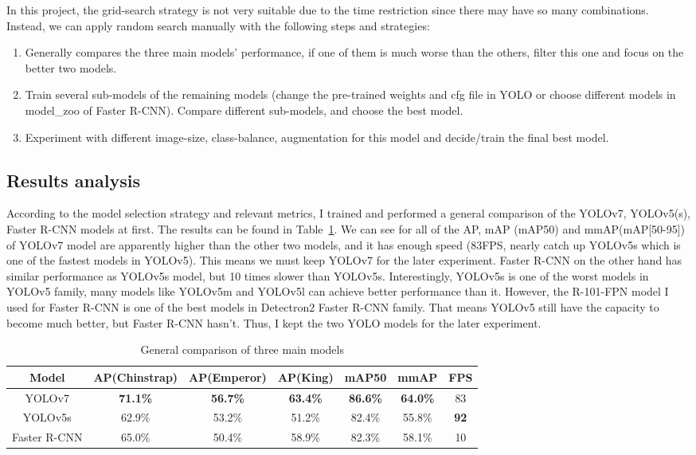 \documentclass[runningheads]{llncs}
\begin{document}
In this project, the grid-search strategy is not very suitable due to the time restriction since there may have so many combinations. Instead, we can apply random search manually with the following steps and strategies:
\begin{enumerate}
    \item Generally compares the three main models' performance, if one of them is much worse than the others, filter this one and focus on the better two models.
    \item Train several sub-models of the remaining models (change the pre-trained weights and cfg file in YOLO or choose different models in model\_zoo of Faster R-CNN). Compare different sub-models, and choose the best model.
    \item Experiment with different image-size, class-balance, augmentation for this model and decide/train the final best model.
\end{enumerate}


\subsection{Results analysis}
According to the model selection strategy and relevant metrics, I trained and performed a general comparison of the YOLOv7, YOLOv5(s), Faster R-CNN models at first. The results can be found in Table~\ref{tab1}. We can see for all of the AP, mAP (mAP50) and mmAP(mAP[50-95]) of YOLOv7 model are apparently higher than the other two models, and it has enough speed (83FPS, nearly catch up YOLOv5s which is one of the fastest models in YOLOv5). This means we must keep YOLOv7 for the later experiment. Faster R-CNN on the other hand has similar performance as YOLOv5s model, but 10 times slower than YOLOv5s. Interestingly, YOLOv5s is one of the worst models in YOLOv5 family, many models like YOLOv5m and YOLOv5l can achieve better performance than it. However, the R-101-FPN model I used for Faster R-CNN is one of the best models in Detectron2 Faster R-CNN family. That means YOLOv5 still have the capacity to become much better, but Faster R-CNN hasn't. Thus, I kept the two YOLO models for the later experiment.

\begin{table}
\centering
\caption{General comparison of three main models}\label{tab1}
\begin{tabular}{|c|c|c|c|c|c|c|}
\hline
\textbf{Model} & \textbf{AP(Chinstrap)} & \textbf{AP(Emperor)} & \textbf{AP(King)} & \textbf{mAP50} & \textbf{mmAP} & \textbf{FPS} \\
\hline
YOLOv7 & \textbf{71.1\%} & \textbf{56.7\%} & \textbf{63.4\%} & \textbf{86.6\%} & \textbf{64.0\%} & 83 \\
YOLOv5s & 62.9\% & 53.2\% & 51.2\% & 82.4\% & 55.8\% & \textbf{92} \\
Faster R-CNN & 65.0\% & 50.4\% & 58.9\% & 82.3\% & 58.1\% & 10\\
\hline
\end{tabular}
\end{table}
\end{document}
